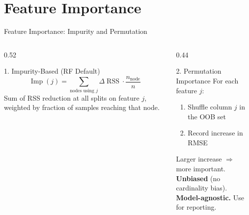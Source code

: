 \documentclass[aspectratio=169, 10pt]{beamer}
\begin{document}
\section{Feature Importance}


\begin{frame}{Feature Importance: Impurity and Permutation}
  \begin{columns}[T]
    \begin{column}{0.52\textwidth}
      \begin{definitionbox}{1. Impurity-Based (RF Default)}
        \footnotesize
        \[
          \operatorname{Imp}(j)
          = \sum_{\text{nodes using } j}
            \Delta\operatorname{RSS} \cdot \frac{n_{\text{node}}}{n}
        \]
        Sum of RSS reduction at all splits on feature $j$,
        weighted by fraction of samples reaching that node.
      \end{definitionbox}

      \smallskip
    \end{column}
    \begin{column}{0.44\textwidth}
      \begin{definitionbox}{2. Permutation Importance}
        \footnotesize
        For each feature $j$:
        \begin{enumerate}
          \item Shuffle column $j$ in the OOB set
          \item Record increase in RMSE
        \end{enumerate}
        Larger increase $\Rightarrow$ more important.\\[2pt]
        \textbf{Unbiased} (no cardinality bias).\\
        \textbf{Model-agnostic.} Use for reporting.
      \end{definitionbox}
    \end{column}
  \end{columns}
\end{frame}
\end{document}
